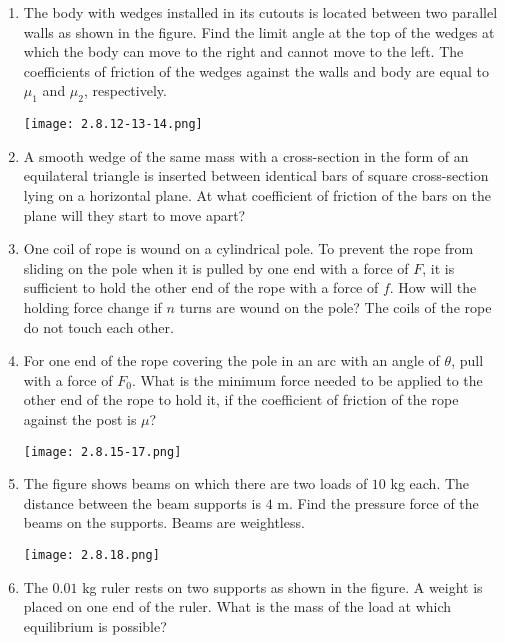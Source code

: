 \documentclass{article}
\begin{document}
\begin{enumerate}[label=2.8.\arabic*]
\item The body with wedges installed in its cutouts is located between two parallel walls as shown in the figure. Find the limit angle at the top of the wedges at which the body can move to the right and cannot move to the left. The coefficients of friction of the wedges against the walls and body are equal to $\mu_1$ and $\mu_2$, respectively.

\begin{center}
    \texttt{[image: 2.8.12-13-14.png]}
\end{center}

\item A smooth wedge of the same mass with a cross-section in the form of an equilateral triangle is inserted between identical bars of square cross-section lying on a horizontal plane. At what coefficient of friction of the bars on the plane will they start to move apart?

\item One coil of rope is wound on a cylindrical pole. To prevent the rope from sliding on the pole when it is pulled by one end with a force of $F$, it is sufficient to hold the other end of the rope with a force of $f$. How will the holding force change if $n$ turns are wound on the pole? The coils of the rope do not touch each other.

\item For one end of the rope covering the pole in an arc with an angle of $\theta$, pull with a force of $F_0$. What is the minimum force needed to be applied to the other end of the rope to hold it, if the coefficient of friction of the rope against the post is $\mu$?

\begin{center}
    \texttt{[image: 2.8.15-17.png]}
\end{center}

\item The figure shows beams on which there are two loads of $10$ kg each. The distance between the beam supports is $4$ m. Find the pressure force of the beams on the supports. Beams are weightless.

\begin{center}
    \texttt{[image: 2.8.18.png]}
\end{center}

\item The $0.01$ kg ruler rests on two supports as shown in the figure. A weight is placed on one end of the ruler. What is the mass of the load at which equilibrium is possible?


\end{enumerate}
\end{document}
